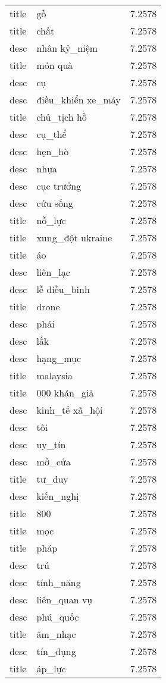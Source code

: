 \documentclass{article}
\begin{document}
\begin{tabular}{lll}
title & gỗ & 7.2578\\
title & chất & 7.2578\\
desc & nhân kỷ\_niệm & 7.2578\\
title & món quà & 7.2578\\
desc & cụ & 7.2578\\
desc & điều\_khiển xe\_máy & 7.2578\\
title & chủ\_tịch hồ & 7.2578\\
desc & cụ\_thể & 7.2578\\
desc & hẹn\_hò & 7.2578\\
desc & nhựa & 7.2578\\
desc & cục trưởng & 7.2578\\
desc & cứu sống & 7.2578\\
title & nỗ\_lực & 7.2578\\
title & xung\_đột ukraine & 7.2578\\
title & áo & 7.2578\\
desc & liên\_lạc & 7.2578\\
desc & lễ diễu\_binh & 7.2578\\
title & drone & 7.2578\\
desc & phải & 7.2578\\
desc & lắk & 7.2578\\
desc & hạng\_mục & 7.2578\\
title & malaysia & 7.2578\\
title & 000 khán\_giả & 7.2578\\
desc & kinh\_tế xã\_hội & 7.2578\\
desc & tôi & 7.2578\\
desc & uy\_tín & 7.2578\\
desc & mở\_cửa & 7.2578\\
title & tư\_duy & 7.2578\\
desc & kiến\_nghị & 7.2578\\
title & 800 & 7.2578\\
title & mọc & 7.2578\\
title & pháp & 7.2578\\
desc & trú & 7.2578\\
desc & tính\_năng & 7.2578\\
desc & liên\_quan vụ & 7.2578\\
desc & phú\_quốc & 7.2578\\
title & âm\_nhạc & 7.2578\\
desc & tín\_dụng & 7.2578\\
title & áp\_lực & 7.2578\\

\end{tabular}
\end{document}
